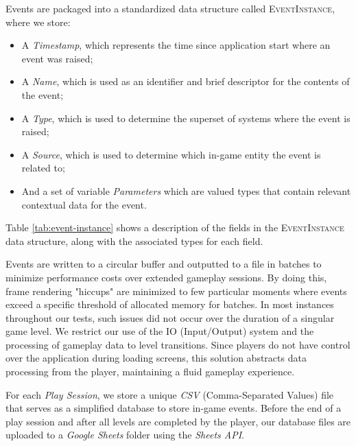 Events are packaged into a standardized data structure called \textsc{EventInstance}, where we store: 
\begin{itemize}
    \item{A \emph{Timestamp}, which represents the time since application start where an event was raised;}
    \item{A \emph{Name}, which is used as an identifier and brief descriptor for the contents of the event;}
    \item{A \emph{Type}, which is used to determine the superset of systems where the event is raised;}
    \item{A \emph{Source}, which is used to determine which in-game entity the event is related to;}
    \item{And a set of variable \emph{Parameters} which are valued types that contain relevant contextual data for the event.}
\end{itemize}

Table \ref{tab:event-instance} shows a description of the fields in the \textsc{EventInstance} data structure, along with the associated types for each field.



Events are written to a circular buffer and outputted to a file in batches to minimize performance costs over extended gameplay sessions. By doing this, frame rendering "hiccups" are minimized to few particular moments where events exceed a specific threshold of allocated memory for batches. In most instances throughout our tests, such issues did not occur over the duration of a singular game level. We restrict our use of the IO (Input/Output) system and the processing of gameplay data to level transitions. Since players do not have control over the application during loading screens, this solution abstracts data processing from the player, maintaining a fluid gameplay experience.


For each \emph{Play Session}, we store a unique \emph{CSV} (Comma-Separated Values) file that serves as a simplified database to store in-game events. Before the end of a play session and after all levels are completed by the player, our database files are uploaded to a \emph{Google Sheets} folder using the \emph{Sheets API}.

